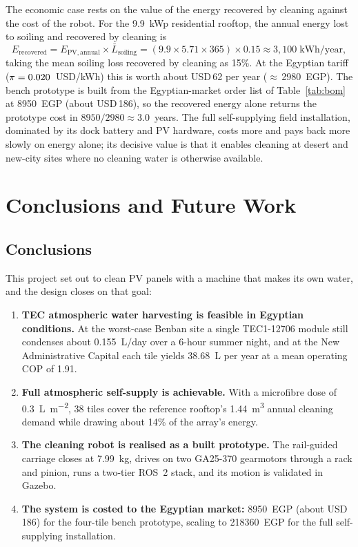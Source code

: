\documentclass[12pt,a4paper]{report}   %
\begin{document}
The economic case rests on the value of the energy recovered by cleaning against the cost of the
robot. For the 9.9~kWp residential rooftop, the annual energy lost to soiling and recovered by
cleaning is
\begin{equation}
  E_{\mathrm{recovered}} = E_{\mathrm{PV,annual}} \times \bar{L}_{\mathrm{soiling}}
  = (9.9 \times 5.71 \times 365) \times 0.15 \approx 3{,}100\;\text{kWh/year},
\end{equation}
taking the mean soiling loss recovered by cleaning as 15\%. At the Egyptian tariff
($\pi = 0.020$~USD/kWh) this is worth about USD\,62 per year ($\approx$\,\num{2980}~EGP).
The bench prototype is built from the Egyptian-market order list of Table~\ref{tab:bom} at
\num{8950}~EGP (about USD\,186), so the recovered energy alone returns the prototype cost in
$\num{8950}/\num{2980} \approx 3.0$~years. The full self-supplying field installation, dominated
by its dock battery and PV hardware, costs more and pays back more slowly on energy alone; its
decisive value is that it enables cleaning at desert and new-city sites where no cleaning water is
otherwise available.

\chapter{Conclusions and Future Work}

\section{Conclusions}

This project set out to clean PV panels with a machine that makes its own water, and the
design closes on that goal:

\begin{enumerate}[leftmargin=*]
  \item \textbf{TEC atmospheric water harvesting is feasible in Egyptian conditions.} At the
  worst-case Benban site a single TEC1-12706 module still condenses about 0.155~L/day over a
  6-hour summer night, and at the New Administrative Capital each tile yields
  \SI{38.68}{\liter} per year at a mean operating COP of 1.91.
  \item \textbf{Full atmospheric self-supply is achievable.} With a microfibre dose of
  \SI{0.3}{\liter\per\metre\squared}, 38 tiles cover the reference rooftop's
  \SI{1.44}{\cubic\metre} annual cleaning demand while drawing about 14\% of the array's
  energy.
  \item \textbf{The cleaning robot is realised as a built prototype.} The rail-guided carriage
  closes at 7.99~kg, drives on two GA25-370 gearmotors through a rack and pinion, runs a
  two-tier ROS~2 stack, and its motion is validated in Gazebo.
  \item \textbf{The system is costed to the Egyptian market:} \num{8950}~EGP (about USD\,186)
  for the four-tile bench prototype, scaling to \num{218360}~EGP for the full self-supplying
  installation.
\end{enumerate}
\end{document}
